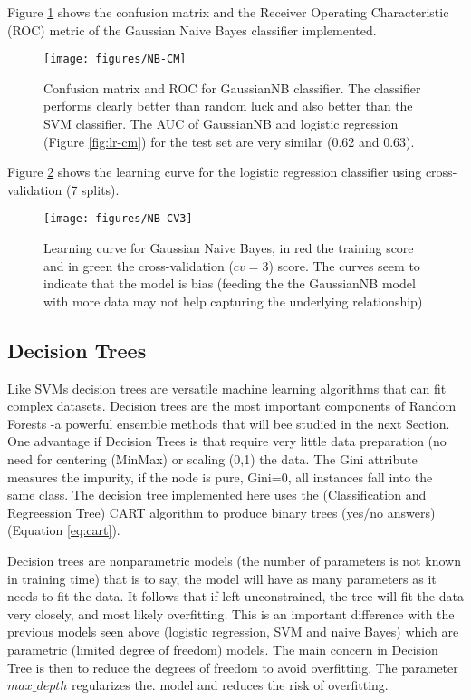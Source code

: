 \documentclass[11pt]{article}
\theoremstyle{definition}
\theoremstyle{remark}
\begin{document}
{Figure \ref{fig:nb-cm} shows the confusion matrix and the Receiver Operating Characteristic (ROC) metric of the Gaussian Naive Bayes classifier implemented.
\begin{figure}[H]
        \centering
        \texttt{[image: figures/NB-CM]}
        \caption{Confusion matrix and ROC for GaussianNB classifier. The classifier performs clearly better than random luck and also better than the SVM classifier. The AUC of GaussianNB and logistic regression (Figure \ref{fig:lr-cm}) for the test set  are very similar (0.62 and 0.63).} \label{fig:nb-cm}
\end{figure}

Figure \ref{fig:nb-cv3} shows the learning curve for the logistic regression classifier using cross-validation (7 splits).
\begin{figure}[H]
        \centering
        \texttt{[image: figures/NB-CV3]}
        \caption{Learning curve for Gaussian Naive Bayes, in red the training score and in green the cross-validation ($cv=3$) score. The curves seem to indicate that the model is bias (feeding the the GaussianNB model with more data may not help capturing the underlying relationship)
        } \label{fig:nb-cv3}
\end{figure}

\subsection{Decision Trees}
\label{se:resdectree}
Like SVMs decision trees are versatile machine learning algorithms that can fit complex datasets. Decision trees are the most important components of Random Forests -a powerful ensemble methods that will bee studied in the next Section.
One advantage if Decision Trees is that require very little data preparation (no need for centering (MinMax) or scaling (0,1) the data.
The Gini attribute measures the impurity, if the node is pure, Gini=0, all instances fall into the same class.
The decision tree implemented here uses the (Classification and Regreession Tree) CART algorithm to produce binary trees (yes/no answers) (Equation \ref{eq:cart}).
 
Decision trees are nonparametric models (the number of parameters is not known in training time) that is to say, the model will have as many parameters as it needs to fit the data. It follows that if left unconstrained, the tree will fit the data very closely, and most likely overfitting. This is an important difference with the previous models seen above (logistic regression, SVM and naive Bayes) which are parametric (limited degree of freedom) models. 
The main concern in Decision Tree is then to reduce the degrees of freedom to avoid overfitting. The parameter $max\_depth$ regularizes the. model and reduces the risk of overfitting.

}
\end{document}
